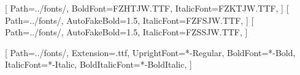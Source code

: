 
\usepackage{fancyhdr} %
\usepackage{lastpage} %
\setlength{\headheight}{13pt} %

\makeatletter
\let\oldauthor\author
\renewcommand{\author}[1]{\oldauthor{#1}\def\myauthor{#1}}
\let\olddate\date
\renewcommand{\date}[1]{\olddate{#1}\def\mydate{#1}}
\makeatother

\pagestyle{fancy} %
\fancyhf{} %

\fancyhead[L]{\myauthor} %
\fancyhead[R]{\mydate} %

\cfoot{\thepage\ / \pageref*{LastPage}} %


\usepackage[T1]{fontenc} %
\usepackage{anyfontsize}
\usepackage{lmodern} %
\usepackage{libertine} %

[ %
    Path=../fonts/,
    BoldFont=FZHTJW.TTF, %
    ItalicFont=FZKTJW.TTF, %
]
[ %
    Path=../fonts/,
    AutoFakeBold=1.5,  %
    ItalicFont=FZFSJW.TTF, %
]
[ %
    Path=../fonts/,
    AutoFakeBold=1.5,  %
    ItalicFont=FZSSJW.TTF, %
] 

\setmonofont{MapleMono-NF-CN}[ %
    Path=../fonts/, %
    Extension=.ttf, %
    UprightFont=*-Regular, %
    BoldFont=*-Bold, %
    ItalicFont=*-Italic, %
    BoldItalicFont=*-BoldItalic, %
]


